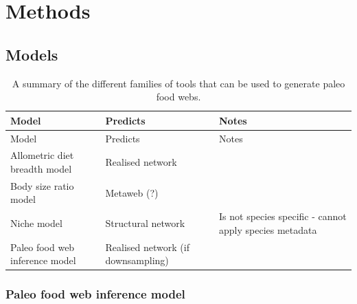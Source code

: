 \documentclass[
]{article}
\begin{document}
\section{Methods}\label{methods}

\subsection{Models}\label{models}

\begin{longtable}[]{@{}
  >{\raggedright\arraybackslash}p{}
  >{\raggedright\arraybackslash}p{}
  >{\raggedright\arraybackslash}p{}@{}}
\caption{A summary of the different families of tools that can be used
to generate paleo food webs.}\label{tbl-models}\tabularnewline
\toprule\noalign{}
\begin{minipage}[b]{\linewidth}\raggedright
Model
\end{minipage} & \begin{minipage}[b]{\linewidth}\raggedright
Predicts
\end{minipage} & \begin{minipage}[b]{\linewidth}\raggedright
Notes
\end{minipage} \\
\midrule\noalign{}
\endfirsthead
\toprule\noalign{}
\begin{minipage}[b]{\linewidth}\raggedright
Model
\end{minipage} & \begin{minipage}[b]{\linewidth}\raggedright
Predicts
\end{minipage} & \begin{minipage}[b]{\linewidth}\raggedright
Notes
\end{minipage} \\
\midrule\noalign{}
\endhead
\bottomrule\noalign{}
\endlastfoot
Allometric diet breadth model & Realised network & \\
Body size ratio model & Metaweb (?) & \\
Niche model & Structural network & Is not species specific - cannot
apply species metadata \\
Paleo food web inference model & Realised network (if downsampling) & \\
\end{longtable}

\subsubsection{Paleo food web inference
model}\label{paleo-food-web-inference-model}
\end{document}
